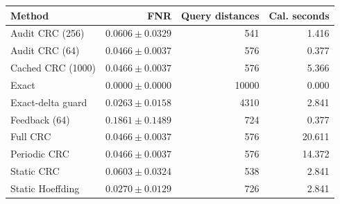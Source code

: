 \begin{tabular}{lrrr}
\hline
Method & FNR & Query distances & Cal. seconds \\
\hline
Audit CRC (256) & $0.0606 \pm 0.0329$ & 541 & 1.416 \\
Audit CRC (64) & $0.0466 \pm 0.0037$ & 576 & 0.377 \\
Cached CRC (1000) & $0.0466 \pm 0.0037$ & 576 & 5.366 \\
Exact & $0.0000 \pm 0.0000$ & 10000 & 0.000 \\
Exact-delta guard & $0.0263 \pm 0.0158$ & 4310 & 2.841 \\
Feedback (64) & $0.1861 \pm 0.1489$ & 724 & 0.377 \\
Full CRC & $0.0466 \pm 0.0037$ & 576 & 20.611 \\
Periodic CRC & $0.0466 \pm 0.0037$ & 576 & 14.372 \\
Static CRC & $0.0603 \pm 0.0324$ & 538 & 2.841 \\
Static Hoeffding & $0.0270 \pm 0.0129$ & 726 & 2.841 \\
\hline
\end{tabular}
